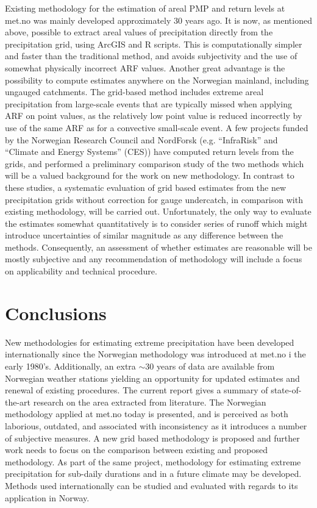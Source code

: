 \documentclass[12pt,a4paper,english]{article}
\begin{document}
Existing methodology for the estimation of areal PMP and return levels at met.no was mainly developed approximately 30 years ago. It is now, as mentioned above, possible to extract areal values of precipitation directly from the precipitation grid, using ArcGIS and R scripts. This is computationally simpler and faster than the traditional method, and avoids subjectivity and the use of somewhat physically incorrect ARF values. Another great advantage is the possibility to compute estimates anywhere on the Norwegian mainland, including ungauged catchments. The grid-based method includes extreme areal precipitation from large-scale events that are typically missed when applying ARF on point values, as the relatively low point value is reduced incorrectly by use of the same ARF as for a convective small-scale event. A few projects funded by the Norwegian Research Council and NordForsk (e.g. ``InfraRisk'' and ``Climate and Energy Systems'' (CES)) have computed return levels from the grids, and \cite{Alfnes2007} performed a preliminary comparison study of the two methods which will be a valued background for the work on new methodology. In contrast to these studies, a systematic evaluation of grid based estimates from the new precipitation grids without correction for gauge undercatch, in comparison with existing methodology, will be carried out. Unfortunately, the only way to evaluate the estimates somewhat quantitatively is to consider series of runoff which might introduce uncertainties of similar magnitude as any difference between the methods. Consequently, an assessment of whether estimates are reasonable will be mostly subjective and any recommendation of methodology will include a focus on applicability and technical procedure. 
 

\section{Conclusions}

New methodologies for estimating extreme precipitation have been developed internationally since the Norwegian methodology was introduced at met.no i the early 1980's. Additionally, an extra $\sim$30 years of data are available from Norwegian weather stations yielding an opportunity for updated estimates and renewal of existing procedures. The current report gives a summary of state-of-the-art research on the area extracted from literature. The Norwegian methodology applied at met.no today is presented, and is perceived as both laborious, outdated, and associated with inconsistency as it introduces a number of subjective measures. A new grid based methodology is proposed and further work needs to focus on the comparison between existing and proposed methodology. As part of the same project, methodology for estimating extreme precipitation for sub-daily durations and in a future climate may be developed. Methods used internationally can be studied and evaluated with regards to its application in Norway.
\end{document}
